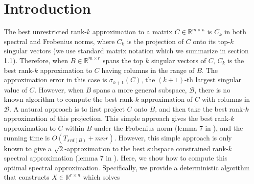 \documentclass[11pt]{article}
\def\reals{\mathbb{R}}
\newcommand{\norm}[1]{\left\|#1\right\|}
\newcommand{\B}{\mathcal{B}}
\begin{document}
\section{Introduction}
The best unrestricted rank-$k$ approximation to a matrix $C \in \reals^{m \times n}$ is $C_k$ in both spectral and Frobenius norms, where $C_k$ is the projection of $C$ onto its top-$k$ singular vectors (we use standard matrix notation which we summarize in section 1.1). Therefore, when $B \in \reals^{m \times r}$ spans the top $k$ singular vectors of $C$, $C_k$ is the best rank-$k$ approximation to $C$ having columns in the range of $B$. The approximation error in this case is $\sigma_{k+1}(C)$, the $(k+1)$-th largest singular value of $C$. 
However, when $B$ spans a more general subspace, $\B$, there is no known algorithm to compute the best rank-$k$ approximation of $C$ with columns in $\B$. A natural approach is to first project $C$ onto $B$, and then take the best rank-$k$ approximation of this projection. This simple approach gives the best rank-$k$ approximation to $C$ within $B$ under the Frobenius norm (lemma 7 in \cite{BDM}), and the running time is $O(T_{svd(B)}+ mnr)$.  However, this simple approach is only 
known to give a $\sqrt{2}$-approximation to the best subspace constrained rank-$k$ spectral approximation (lemma 7 in \cite{BDM}). 
Here, we show how to compute this optimal spectral approximation. Specifically, we provide a deterministic algorithm that constructs $X \in \reals^{r \times n}$ which solves
\end{document}

